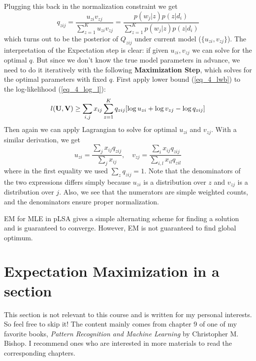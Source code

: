 \documentclass[../main.tex]{subfiles}
\begin{document}
Plugging this back in the normalization constraint we get
\begin{equation*}
q_{zij} = \frac{u_{zi}v_{zj}}{\sum_{z=1}^{K}u_{zi}v_{zj}} = \frac{p(w_j|z)p(z|d_i)}{\sum_{z=1}^{K}p(w_j|z)p(z|d_i)}
\end{equation*}
which turns out to be the posterior of $Q_{zij}$ under current model ($\{u_{zi},v_{zj}\}$). The interpretation of the Expectation step is clear: if given $u_{zi},v_{zj}$ we can solve for the optimal $q$. But since we don't know the true model parameters in advance, we need to do it iteratively with the following \textbf{Maximization Step}, which solves for the optimal parameters with fixed $q$. First apply lower bound (\ref{eq_4_lwb}) to the log-likelihood (\ref{eq_4_log_l}):
\begin{equation*}
l({\bf U},{\bf V}) \geq \sum_{i,j}x_{ij} \sum_{z=1}^{K} q_{zij}[\log u_{zi} + \log v_{zj} - \log q_{zij}]
\end{equation*}
Then again we can apply Lagrangian to solve for optimal $u_{zi}$ and $v_{zj}$. With a similar derivation, we get
\begin{equation*}
u_{zi}=\frac{\sum_{j}x_{ij}q_{zij}}{\sum_{j}x_{ij}},\quad v_{zj}=\frac{\sum_{i}x_{ij}q_{zij}}{\sum_{i,l}x_{il}q_{zil}}
\end{equation*}
where in the first equality we used $\sum_{z} q_{zij}=1$. Note that the denominators of the two expressions differs simply because $u_{zi}$ is a distribution over $z$ and $v_{zj}$ is a distribution over $j$. Also, we see that the numerators are simple weighted counts, and the denominators ensure proper normalization.
\par EM for MLE in pLSA gives a simple alternating scheme for finding a solution and is guaranteed to converge. However, EM is not guaranteed to find global optimum.
\section{Expectation Maximization in a section}\label{sec_4_EM}
This section is not relevant to this course and is written for my personal interests. So feel free to skip it! The content mainly comes from chapter 9 of one of my favorite books, \emph{Pattern Recognition and Machine Learning} by Christopher M. Bishop. I recommend ones who are interested in more materials to read the corresponding chapters.
\end{document}
